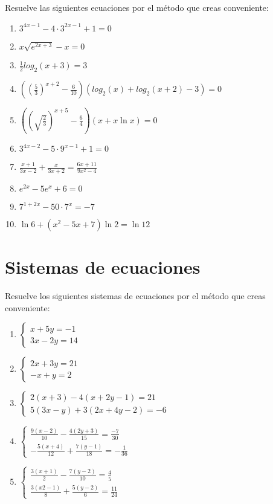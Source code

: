 \Exercicio Resuelve las siguientes ecuaciones por el método que creas conveniente:
\begin{enumerate}[topsep=0pt]
	\item $ 3^{4x-1} - 4 \cdot 3^{2x-1} + 1 = 0 $
	\item $ x \sqrt{e^{2x+3}} -x = 0$
	\item $ \frac{1}{2} log_2 (x+3) = 3$
	\item $ \left(\left(\frac{5}{3}\right)^{x+2}-\frac{6}{10}\right)(log_2 (x) + log_2(x+2) - 3) = 0$
	\item $\left(\displaystyle \left(\sqrt{\frac{2}{3}}\right)^{x+5}-\displaystyle \frac{6}{4}\right)(x+x\ln x)=0$
	\item $3^{4x-2}-5\cdot 9^{x-1}+1=0$
	\item $\displaystyle \frac{x+1}{3x-2}+\frac{x}{3x+2}=\frac{6x+11}{9x^2-4}$
	\item $e^{2x}-5e^x+6=0$
	\item $7^{1+2x}-50\cdot 7^{x}=-7$
	\item $ \ln 6 + (x^2-5x + 7) \ln 2 = \ln 12$
\end{enumerate}

\section{Sistemas de ecuaciones}

\Exercicio Resuelve los siguientes sistemas de ecuaciones por el método que creas conveniente:

\begin{enumerate}[topsep=0pt]
	\item $\begin{cases}
			x+5y = -1 \\
			3x-2y = 14
			\end{cases}$
	\item $\begin{cases}
			2x+3y = 21 \\
			-x + y = 2
			\end{cases}$
	\item $\begin{cases}
			2(x+3) - 4(x+2y-1) = 21 \\
			5(3x-y) + 3(2x+4y-2) = -6
		   \end{cases}$
	\item $\begin{cases}
			\frac{9(x-2)}{10} - \frac{4(2y + 3)}{15} = \frac{-7}{30} \\
			-\frac{5(x+4)}{12} + \frac{7(y-1)}{18} = -\frac{1}{36}
		   \end{cases} $
	\item $\begin{cases}
			\frac{3(x+1)}{2} - \frac{7(y-2)}{10} = \frac{4}{5} \\
			\frac{3(x2-1)}{8} + \frac{5(y-2)}{6} = \frac{11}{24}
		   \end{cases}$
\end{enumerate}


